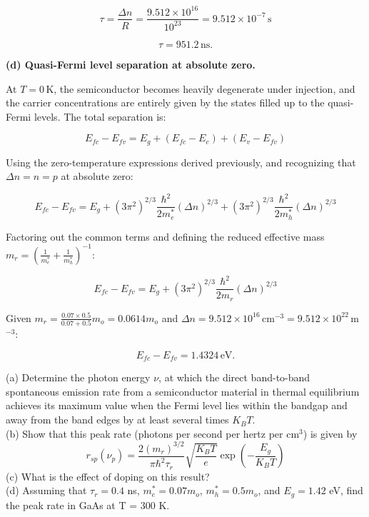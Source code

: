 \begin{equation*}
  \tau = \frac{\Delta n}{R} = \frac{9.512 \times 10^{16}}{10^{23}} = 9.512 \times 10^{-7}\,\text{s}
\end{equation*}

\begin{equation*}
  \boxed{\tau = 951.2\,\text{ns}.}
\end{equation*}

\textbf{(d) Quasi-Fermi level separation at absolute zero.}

At $T = 0$\,K, the semiconductor becomes heavily degenerate under injection, and the carrier concentrations are entirely given by the states filled up to the quasi-Fermi levels. The total separation is:

\begin{equation*}
  E_{fc} - E_{fv} = E_g + (E_{fc} - E_c) + (E_v - E_{fv})
\end{equation*}

Using the zero-temperature expressions derived previously, and recognizing that $\Delta n = n = p$ at absolute zero:

\begin{equation*}
  E_{fc} - E_{fv} = E_g + (3\pi^2)^{2/3} \frac{\hbar^2}{2 m_e^*} (\Delta n)^{2/3} + (3\pi^2)^{2/3} \frac{\hbar^2}{2 m_h^*} (\Delta n)^{2/3}
\end{equation*}

Factoring out the common terms and defining the reduced effective mass $m_r = \left(\frac{1}{m_e^*} + \frac{1}{m_h^*}\right)^{-1}$:

\begin{equation*}
  E_{fc} - E_{fv} = E_g + (3\pi^2)^{2/3} \frac{\hbar^2}{2 m_r} (\Delta n)^{2/3}
\end{equation*}

Given $m_r = \frac{0.07 \times 0.5}{0.07 + 0.5} m_o = 0.0614 m_o$ and $\Delta n = 9.512 \times 10^{16}$\,cm$^{-3} = 9.512 \times 10^{22}$\,m$^{-3}$:

\begin{equation*}
  \boxed{E_{fc} - E_{fv} = 1.4324\,\text{eV}.}
\end{equation*}


\begin{question}[Question 11]
(a) Determine the photon energy $\nu$, at which the direct band-to-band spontaneous emission rate from a semiconductor material in thermal equilibrium achieves its maximum value when the Fermi level lies within the bandgap and away from the band edges by at least several times $K_B T$.\\
(b) Show that this peak rate (photons per second per hertz per cm$^3$) is given by
\begin{equation*}
r_{sp}(\nu_p) = \frac{2(m_r)^{3/2}}{\pi\hbar^2\tau_r} \sqrt{\frac{K_B T}{e}} \exp\left(-\frac{E_g}{K_B T}\right)
\end{equation*}
(c) What is the effect of doping on this result?\\
(d) Assuming that $\tau_r = 0.4$ ns, $m_e^* = 0.07 m_o$, $m_h^* = 0.5 m_o$, and $E_g = 1.42$ eV, find the peak rate in GaAs at T = 300 K.
\end{question}

